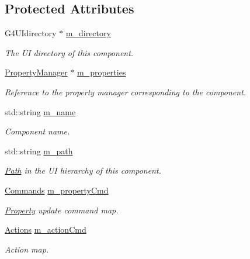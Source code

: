 \subsection*{Protected Attributes}
\begin{DoxyCompactItemize}
\item 
G4\+U\+Idirectory $\ast$ \hyperlink{class_d_d4hep_1_1_simulation_1_1_geant4_u_i_messenger_a6774d3061088d7b9391770e8dc74385e}{m\+\_\+directory}
\begin{DoxyCompactList}\small\item\em The UI directory of this component. \end{DoxyCompactList}\item 
\hyperlink{class_d_d4hep_1_1_property_manager}{Property\+Manager} $\ast$ \hyperlink{class_d_d4hep_1_1_simulation_1_1_geant4_u_i_messenger_a6be8711d442a1d0031c83f9a5300f1eb}{m\+\_\+properties}
\begin{DoxyCompactList}\small\item\em Reference to the property manager corresponding to the component. \end{DoxyCompactList}\item 
std\+::string \hyperlink{class_d_d4hep_1_1_simulation_1_1_geant4_u_i_messenger_ab6322440ddac03e9b62f5560c7d11dbf}{m\+\_\+name}
\begin{DoxyCompactList}\small\item\em Component name. \end{DoxyCompactList}\item 
std\+::string \hyperlink{class_d_d4hep_1_1_simulation_1_1_geant4_u_i_messenger_a8b314ffb2df2f6268eb13abdad35c1dc}{m\+\_\+path}
\begin{DoxyCompactList}\small\item\em \hyperlink{class_d_d4hep_1_1_path}{Path} in the UI hierarchy of this component. \end{DoxyCompactList}\item 
\hyperlink{class_d_d4hep_1_1_simulation_1_1_geant4_u_i_messenger_a07e66059e5542ef6c393fda188f44907}{Commands} \hyperlink{class_d_d4hep_1_1_simulation_1_1_geant4_u_i_messenger_a79be5ed431c95728e21ba8119138dff0}{m\+\_\+property\+Cmd}
\begin{DoxyCompactList}\small\item\em \hyperlink{class_d_d4hep_1_1_property}{Property} update command map. \end{DoxyCompactList}\item 
\hyperlink{class_d_d4hep_1_1_simulation_1_1_geant4_u_i_messenger_a91b01eab1bb56af8661d2c99660211cd}{Actions} \hyperlink{class_d_d4hep_1_1_simulation_1_1_geant4_u_i_messenger_afb818b60e55fd0ccd83ec5f7b78eb82c}{m\+\_\+action\+Cmd}
\begin{DoxyCompactList}\small\item\em Action map. \end{DoxyCompactList}\end{DoxyCompactItemize}


